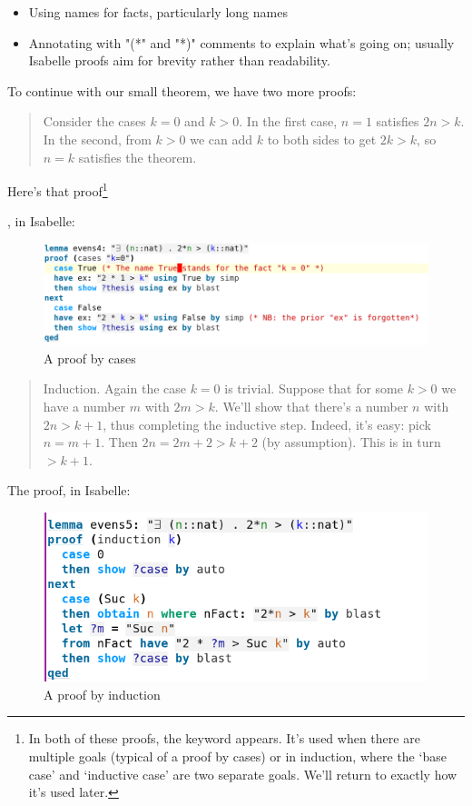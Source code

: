 \begin{itemize}
    \item Using names for facts, particularly long names
    \item Annotating with "(*" and  "*)" comments to explain what's going on; usually Isabelle proofs aim for brevity rather than readability.
\end{itemize}

To continue with our small theorem, we have two more proofs: 

\begin{quotation}
Consider the cases $k = 0$ and $k > 0$. In the first case, $n = 1$ satisfies $2n > k$. In the second, from $k > 0$ we can add $k$ to both sides to get $2k > k$, so $n = k$ satisfies the theorem.
\end{quotation}

Here's that proof\footnote{In both of these proofs, the keyword  appears. It's used when there are multiple goals (typical of a proof by cases) or in induction, where the `base case' and `inductive case' are two separate goals. We'll return to exactly how it's used later.}

, in Isabelle:
\begin{figure}[h]
    \includegraphics[width=1\linewidth]{C01/Images/proof2.png}
    \caption{A proof by cases}
\end{figure}

\begin{quotation}    
Induction. Again the case $k = 0$ is trivial. Suppose that for some $k > 0$ we have a number $m$ with $2m > k$. We'll show that there's a number $n$ with $2n > k+1$, thus completing the inductive step. Indeed, it's easy: pick $n = m + 1$. Then $2n = 2m + 2  > k + 2$ (by assumption). This is in turn $> k + 1.$ 
\end{quotation}

The proof, in Isabelle:

\begin{figure}[ht]
    \centering
    \includegraphics[width=0.75\linewidth]{C01/Images/proof3.png}
    \caption{A proof by induction}
\end{figure}



